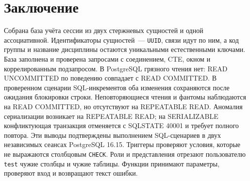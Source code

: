 \documentclass[12pt,a4paper]{article}
\begin{document}
\section*{Заключение}
Собрана база учёта сессии из двух стержневых сущностей и одной ассоциативной. Идентификаторы сущностей~--- \texttt{UUID}, связи идут по ним, а код группы и название дисциплины остаются уникальными естественными ключами. База заполнена и проверена запросами с соединением, CTE, окном и коррелированным подзапросом. В PostgreSQL грязного чтения нет: READ UNCOMMITTED по поведению совпадает с READ COMMITTED. В проверенном сценарии SQL-инкрементов оба изменения сохраняются после ожидания блокировки строки. Неповторяющиеся чтения и фантомы наблюдаются на READ COMMITTED, но отсутствуют на REPEATABLE READ. Аномалия сериализации возникает на REPEATABLE READ; на SERIALIZABLE конфликтующая транзакция отменяется с SQLSTATE 40001 и требует полного повтора. Эти выводы подтверждены выполнением SQL-сценариев в двух независимых сеансах PostgreSQL 16.15. Триггеры проверяют условия, которые не выражаются столбцовым \texttt{CHECK}. Роли и представления отрезают пользователю \texttt{test} чужие столбцы и чужие таблицы. Функции принимают параметры, проверяют вход и возвращают текст ошибки.
\end{document}

